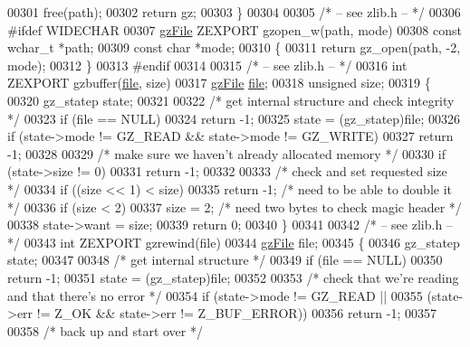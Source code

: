 \begin{DoxyCode}
{{{{00301     free(path);
00302     \textcolor{keywordflow}{return} gz;
00303 \}
00304 
00305 \textcolor{comment}{/* -- see zlib.h -- */}
00306 \textcolor{preprocessor}{#ifdef WIDECHAR}
00307 \hyperlink{structgz_file__s}{gzFile} ZEXPORT gzopen\_w(path, mode)
00308     \textcolor{keyword}{const} \textcolor{keywordtype}{wchar\_t} *path;
00309     \textcolor{keyword}{const} \textcolor{keywordtype}{char} *mode;
00310 \{
00311     \textcolor{keywordflow}{return} gz\_open(path, -2, mode);
00312 \}
00313 \textcolor{preprocessor}{#endif}
00314 
00315 \textcolor{comment}{/* -- see zlib.h -- */}
00316 \textcolor{keywordtype}{int} ZEXPORT gzbuffer(\hyperlink{structfile}{file}, size)
00317     \hyperlink{structgz_file__s}{gzFile} \hyperlink{structfile}{file};
00318     \textcolor{keywordtype}{unsigned} size;
00319 \{
00320     gz\_statep state;
00321 
00322     \textcolor{comment}{/* get internal structure and check integrity */}
00323     \textcolor{keywordflow}{if} (file == NULL)
00324         \textcolor{keywordflow}{return} -1;
00325     state = (gz\_statep)file;
00326     \textcolor{keywordflow}{if} (state->mode != GZ\_READ && state->mode != GZ\_WRITE)
00327         \textcolor{keywordflow}{return} -1;
00328 
00329     \textcolor{comment}{/* make sure we haven't already allocated memory */}
00330     \textcolor{keywordflow}{if} (state->size != 0)
00331         \textcolor{keywordflow}{return} -1;
00332 
00333     \textcolor{comment}{/* check and set requested size */}
00334     \textcolor{keywordflow}{if} ((size << 1) < size)
00335         \textcolor{keywordflow}{return} -1;              \textcolor{comment}{/* need to be able to double it */}
00336     \textcolor{keywordflow}{if} (size < 2)
00337         size = 2;               \textcolor{comment}{/* need two bytes to check magic header */}
00338     state->want = size;
00339     \textcolor{keywordflow}{return} 0;
00340 \}
00341 
00342 \textcolor{comment}{/* -- see zlib.h -- */}
00343 \textcolor{keywordtype}{int} ZEXPORT gzrewind(file)
00344     \hyperlink{structgz_file__s}{gzFile} file;
00345 \{
00346     gz\_statep state;
00347 
00348     \textcolor{comment}{/* get internal structure */}
00349     \textcolor{keywordflow}{if} (file == NULL)
00350         \textcolor{keywordflow}{return} -1;
00351     state = (gz\_statep)file;
00352 
00353     \textcolor{comment}{/* check that we're reading and that there's no error */}
00354     \textcolor{keywordflow}{if} (state->mode != GZ\_READ ||
00355             (state->err != Z\_OK && state->err != Z\_BUF\_ERROR))
00356         \textcolor{keywordflow}{return} -1;
00357 
00358     \textcolor{comment}{/* back up and start over */}
}}}}
\end{DoxyCode}
